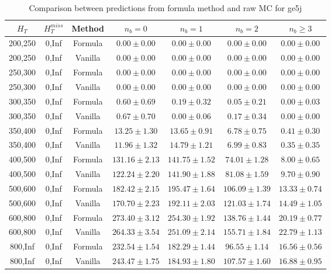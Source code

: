 \begin{longtable}{ | c | c | c | c | c | c | c | }
\caption{Comparison between predictions from formula method and raw MC for ge5j} \label{tab:formula-ge5j} \\    \hline 
$H_{T}$ & $H_{T}^{miss}$ & Method & $n_{b} = 0$ & $n_{b} = 1$ & $n_{b} = 2$ & $n_{b} \ge 3$ \\ \hline200,250 & 0,Inf & Formula  & $     0.00 \pm  0.00 $ & $     0.00 \pm  0.00 $ & $     0.00 \pm  0.00 $ & $     0.00 \pm  0.00 $  \\  
200,250 & 0,Inf & Vanilla  & $     0.00 \pm  0.00 $ & $     0.00 \pm  0.00 $ & $     0.00 \pm  0.00 $ & $     0.00 \pm  0.00 $  \\ \hline 
250,300 & 0,Inf & Formula  & $     0.00 \pm  0.00 $ & $     0.00 \pm  0.00 $ & $     0.00 \pm  0.00 $ & $     0.00 \pm  0.00 $  \\  
250,300 & 0,Inf & Vanilla  & $     0.00 \pm  0.00 $ & $     0.00 \pm  0.00 $ & $     0.00 \pm  0.00 $ & $     0.00 \pm  0.00 $  \\ \hline 
300,350 & 0,Inf & Formula  & $     0.60 \pm  0.69 $ & $     0.19 \pm  0.32 $ & $     0.05 \pm  0.21 $ & $     0.00 \pm  0.03 $  \\  
300,350 & 0,Inf & Vanilla  & $     0.67 \pm  0.70 $ & $     0.00 \pm  0.06 $ & $     0.17 \pm  0.34 $ & $     0.00 \pm  0.00 $  \\ \hline 
350,400 & 0,Inf & Formula  & $    13.25 \pm  1.30 $ & $    13.65 \pm  0.91 $ & $     6.78 \pm  0.75 $ & $     0.41 \pm  0.30 $  \\  
350,400 & 0,Inf & Vanilla  & $    11.96 \pm  1.32 $ & $    14.79 \pm  1.21 $ & $     6.99 \pm  0.83 $ & $     0.35 \pm  0.35 $  \\ \hline 
400,500 & 0,Inf & Formula  & $   131.16 \pm  2.13 $ & $   141.75 \pm  1.52 $ & $    74.01 \pm  1.28 $ & $     8.00 \pm  0.65 $  \\  
400,500 & 0,Inf & Vanilla  & $   122.24 \pm  2.20 $ & $   141.90 \pm  1.88 $ & $    81.08 \pm  1.59 $ & $     9.70 \pm  0.90 $  \\ \hline 
500,600 & 0,Inf & Formula  & $   182.42 \pm  2.15 $ & $   195.47 \pm  1.64 $ & $   106.09 \pm  1.39 $ & $    13.33 \pm  0.74 $  \\  
500,600 & 0,Inf & Vanilla  & $   170.70 \pm  2.23 $ & $   192.11 \pm  2.03 $ & $   121.03 \pm  1.74 $ & $    14.49 \pm  1.05 $  \\ \hline 
600,800 & 0,Inf & Formula  & $   273.40 \pm  3.12 $ & $   254.30 \pm  1.92 $ & $   138.76 \pm  1.44 $ & $    20.19 \pm  0.77 $  \\  
600,800 & 0,Inf & Vanilla  & $   264.33 \pm  3.54 $ & $   251.09 \pm  2.14 $ & $   155.71 \pm  1.84 $ & $    22.79 \pm  1.13 $  \\ \hline 
800,Inf & 0,Inf & Formula  & $   232.54 \pm  1.54 $ & $   182.29 \pm  1.44 $ & $    96.55 \pm  1.14 $ & $    16.56 \pm  0.56 $  \\  
800,Inf & 0,Inf & Vanilla  & $   243.47 \pm  1.75 $ & $   184.93 \pm  1.80 $ & $   107.57 \pm  1.60 $ & $    16.88 \pm  0.95 $  \\ \hline 
    \hline 
    \hline 
\end{longtable}
